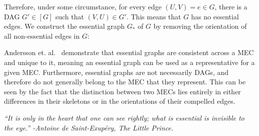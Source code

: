 \begin{example}
Therefore, under some circumstance, for every edge $(U,V) = e \in G$, there is a DAG $G' \in [G]$ such that $(V,U) \in G'$. This means that $G$ has no essential edges. We construct the essential graph $G_{*}$ of $G$ by removing the orientation of all non-essential edges in $G$: 

\begin{center}
\end{center}

\end{example}



\begin{remark}
Andersson et. al.~\cite{andersson} demonstrate that essential graphs are consistent across a MEC and unique to it, meaning an essential graph can be used as a representative for a given MEC. Furthermore, essential graphs are not necessarily DAGs, and therefore do not generally belong to the MEC that they represent. \newline
\null \quad \quad This can be seen by the fact that the distinction between two MECs lies entirely in either differences in their skeletons or in the orientations of their compelled edges. \newline

\textit{``It is only in the heart that one can see rightly; what is essential is invisible to the eye.'' -Antoine de Saint-Exupéry, The Little Prince.}
\end{remark}



